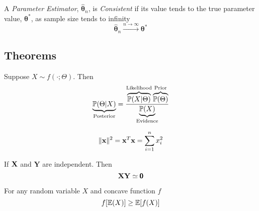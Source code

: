 \documentclass[11pt,a4paper]{article}
\begin{document}

A \textit{Parameter Estimator}, $\hat{\pmb\theta}_n$, is \textit{Consistent} if its value tends to the true parameter value, $\pmb\theta^*$, as sample size tends to infinity
$$\hat{\pmb\theta}_n\overset{n\to\infty}{\longrightarrow}\pmb\theta^*$$

\subsection{Theorems}

Suppose $X\sim f(\cdot;\Theta)$. Then
$$\underbrace{\mathbb{P}(\Theta|X)}_\text{Posterior}=\frac{\overbrace{\mathbb{P}(X|\Theta)}^\text{Likelihood}\overbrace{\mathbb{P}(\Theta)}^\text{Prior}}{\underbrace{\mathbb{P}(X)}_\text{Evidence}}$$

$$\|\textbf{x}\|^2=\textbf{x}^T\textbf{x}=\sum_{i=1}^nx_i^2$$

\theorem{}
If $\textbf{X}$ and $\textbf{Y}$ are independent. Then
$$\textbf{X}\textbf{Y}\simeq\pmb0$$

For any random variable $X$ and concave function $f$
$$f[\mathbb{E}(X)]\geq\mathbb{E}[f(X)]$$
\end{document}
